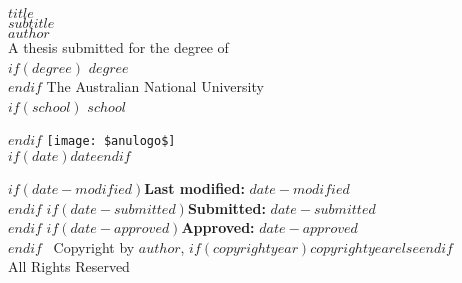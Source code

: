 
\begin{titlepage}
	\begin{center}
		\vspace*{0cm}
		{ \fontsize{24}{10} \selectfont $title$} \\
		\vspace{0.3cm}
		{ \fontsize{20}{10} \selectfont $subtitle$} \\

		\vspace{2.0cm}
		{\bf \huge $author$}\\
		\vspace{2cm}
		{\large A thesis submitted for the degree of}\\
		$if(degree)$\vspace{0.5cm}
		{\it \large $degree$}\\$endif$
		\vspace{0.5cm}
		{\large The Australian National University}\\
		$if(school)$\vspace{0.5cm}
		{ \large $school$} \par$endif$
		\vspace{2.0cm}
		\texttt{[image: \$anulogo\$]}\\
		\vspace{2.0cm}
		$if(date)${\large $date$}$endif$

		$if(date-modified)${\bf Last modified:} $date-modified$\\$endif$
		$if(date-submitted)${\bf Submitted:} $date-submitted$\\$endif$
		$if(date-approved)${\bf Approved:} $date-approved$\\$endif$
		\vspace{1.75cm}
		{\large  \textcopyright\ Copyright by $author$,  $if(copyrightyear)$$copyrightyear$$else$\the\year$endif$\\}
		\vspace{0.5cm}
		{\large All Rights Reserved}
	\end{center}
\end{titlepage}

\sloppy

\setlength{\parindent}{0pt}
\setlength{\parskip}{1ex plus 0.5ex minus 0.2ex}









